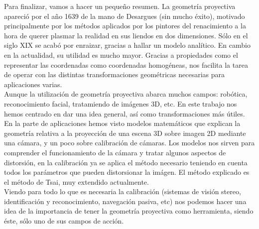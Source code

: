 \documentclass[a4,10pt]{article}
\begin{document}
Para finalizar, vamos a hacer un pequeño resumen. La geometría proyectiva apareció por el año 1639 de la mano de Desargues (sin mucho éxito), motivado principalmente por los métodos aplicados por los pintores del renacimiento a la hora de querer plasmar la realidad en sus liendos en dos dimensiones. Sólo en el siglo XIX se acabó por enraizar, gracias a hallar un modelo analítico. En cambio en la actualidad, su utilidad es mucho mayor. Gracias a propiedades como el representar las coordenadas como coordenadas homogéneas, nos facilita la tarea de operar con las distintas transformaciones geométricas necesarias para aplicaciones varias.\\
Aunque la utilización de geometría proyectiva abarca muchos campos: robótica, reconocimiento facial, tratamiendo de imágenes 3D, etc. En este trabajo nos hemos centrado en dar una idea general, así como transformaciones más útiles. En la parte de aplicaciones hemos visto modelos matemáticos que explican la geometría relativa a la proyección de una escena 3D sobre imagen 2D mediante una cámara, y un poco sobre calibración de cámaras. Los modelos nos sirven para comprender el funcionamiento de la cámara y tratar algunos aspectos de distorsión, en la calibración ya se aplica el método necesario teniendo en cuenta todos los parámetros que pueden distorsionar la imágen. El método explicado es el método de Tsai, muy extendido actualmente.\\
Viendo para todo lo que es necesaria la calibración (sistemas de visión stereo, identificación y reconocimiento, navegación pasiva, etc) nos podemos hacer una idea de la importancia de tener la geometría proyectiva como herramienta, siendo éste, sólo uno de sus campos de acción.\\



\end{document}

